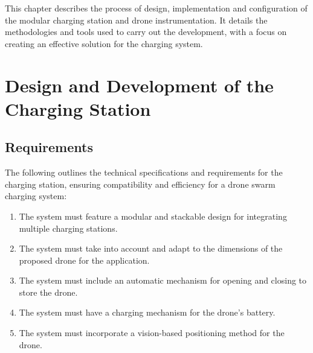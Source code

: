 
This chapter describes the process of design, implementation and configuration of the modular charging station and drone instrumentation. It details the methodologies and tools used to carry out the development, with a focus on creating an effective solution for the charging system.

\section{Design and Development of the Charging Station}
\subsection{Requirements}
The following outlines the technical specifications and requirements for the charging station, ensuring compatibility and efficiency for a drone swarm charging system:
    \begin{enumerate}
        \item The system must feature a modular and stackable design for integrating multiple charging stations.
        \item The system must take into account and adapt to the dimensions of the proposed drone for the application.
        \item The system must include an automatic mechanism for opening and closing to store the drone.
        \item The system must have a charging mechanism for the drone's battery.
        \item The system must incorporate a vision-based positioning method for the drone.
    \end{enumerate}

